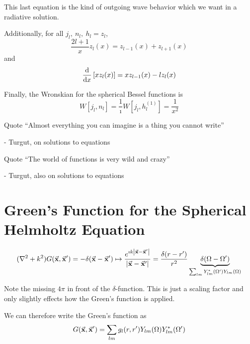 \documentclass[a4paper,twoside,master.tex]{subfiles}
\begin{document}
This last equation is the kind of outgoing wave behavior which we want in a radiative solution.

Additionally, for all $ j_l,\ n_l,\ h_l = z_l $,
\begin{equation}
    \frac{2l+1}{x} z_l(x) = z_{l-1}(x) + z_{l+1}(x)
\end{equation}
and
\begin{equation}
    \dv{x}\left[ x z_l(x) \right] = x z_{l-1}(x) - l z_l(x) 
\end{equation}

Finally, the Wronskian for the spherical Bessel functions is
\begin{equation}
    W\left[ j_l, n_l \right] = \frac{1}{\imath} W\left[ j_l, h_l^{(1)} \right] = \frac{1}{x^2}
\end{equation}

\begin{note}{Quote}
    ``Almost everything you can imagine is a thing you cannot write''

    - Turgut, on solutions to equations
\end{note}
\begin{note}{Quote}
    ``The world of functions is very wild and crazy''
    
    - Turgut, also on solutions to equations
\end{note}

\section{Green's Function for the Spherical Helmholtz Equation}
\label{sec:green's_function_for_the_spherical_helmholtz_equation}

\begin{equation}
    (\laplacian + k^2) G( \va{x}, \va{x}') = - \delta( \va{x} - \va{x}') \mapsto \frac{e^{\imath k \abs{ \va{x} - \va{x}'}}}{\abs{ \va{x} - \va{x}'}} = \frac{\delta(r-r')}{r^2} \underbrace{\delta(\Omega - \Omega')}_{\sum_{lm} Y_{lm}^*(\Omega') Y_{lm}(\Omega)}
\end{equation}

Note the missing $ 4 \pi $ in front of the $ \delta $-function. This is just a scaling factor and only slightly effects how the Green's function is applied.

We can therefore write the Green's function as
\begin{equation}
    G( \va{x}, \va{x}') = \sum_{lm} g_l(r,r') Y_{lm}(\Omega) Y_{lm}^*(\Omega')
\end{equation}
\end{document}
